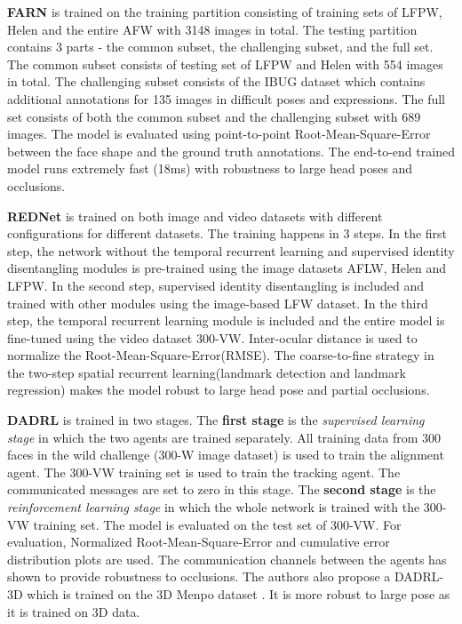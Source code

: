 \documentclass{llncs}
\begin{document}
	\textbf{FARN} \cite{farn} is trained on the training partition consisting of training sets of LFPW, Helen and the entire AFW with 3148 images in total. The testing partition contains 3 parts - the common subset, the challenging subset, and the full set. The common subset consists of testing set of LFPW and Helen with 554 images in total. The challenging subset consists of the IBUG dataset which contains additional annotations for 135 images in difficult poses and expressions. The full set consists of both the common subset and the challenging subset with 689 images. The model is evaluated using point-to-point Root-Mean-Square-Error between the face shape and the ground truth annotations. The end-to-end trained model runs extremely fast (18ms) with robustness to large head poses and occlusions.
	
	\textbf{REDNet} \cite{rednet} is trained on both image and video datasets with different configurations for different datasets. The training happens in 3 steps. In the first step, the network without the temporal recurrent learning and supervised identity disentangling modules is pre-trained using the image datasets AFLW, Helen and LFPW. In the second step, supervised identity disentangling is included and trained with other modules using the image-based LFW dataset. In the third step, the temporal recurrent learning module is included and the entire model is fine-tuned using the video dataset 300-VW. Inter-ocular distance is used to normalize the Root-Mean-Square-Error(RMSE).
	The coarse-to-fine strategy in the two-step spatial recurrent learning(landmark detection and landmark regression) makes the model robust to large head pose and partial occlusions.
	
	\textbf{DADRL} \cite{dadrl} is trained in two stages. The \textbf{first stage} is the \textit{supervised learning stage} in which the two agents are trained separately. All training data from 300 faces in the wild challenge (300-W image dataset) is used to train the alignment agent. The 300-VW training set is used to train the tracking agent. The communicated messages are set to zero in this stage. The \textbf{second stage} is the \textit{reinforcement learning stage} in which the whole network is trained with the 300-VW training set. The model is evaluated on the test set of 300-VW. For evaluation, Normalized Root-Mean-Square-Error and cumulative error distribution plots are used. The communication channels between the agents has shown to provide robustness to occlusions. The authors also propose a DADRL-3D which is trained on the 3D Menpo dataset \cite{3d_menpo}. It is more robust to large pose as it is trained on 3D data.
	
\end{document}
